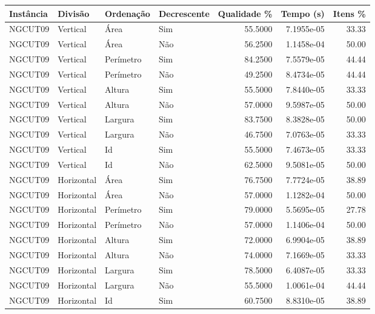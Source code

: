 \begin{tabular}{llllrrr}
\hline
Instância & Divisão     & Ordenação & Decrescente & Qualidade \% & Tempo (s)  & Itens \% \\
\hline
NGCUT09   & Vertical    & Área      & Sim         & 55.5000      & 7.1955e-05 & 33.33    \\
NGCUT09   & Vertical    & Área      & Não         & 56.2500      & 1.1458e-04 & 50.00    \\
NGCUT09   & Vertical    & Perímetro & Sim         & 84.2500      & 7.5579e-05 & 44.44    \\
NGCUT09   & Vertical    & Perímetro & Não         & 49.2500      & 8.4734e-05 & 44.44    \\
NGCUT09   & Vertical    & Altura    & Sim         & 55.5000      & 7.8440e-05 & 33.33    \\
NGCUT09   & Vertical    & Altura    & Não         & 57.0000      & 9.5987e-05 & 50.00    \\
NGCUT09   & Vertical    & Largura   & Sim         & 83.7500      & 8.3828e-05 & 50.00    \\
NGCUT09   & Vertical    & Largura   & Não         & 46.7500      & 7.0763e-05 & 33.33    \\
NGCUT09   & Vertical    & Id        & Sim         & 55.5000      & 7.4673e-05 & 33.33    \\
NGCUT09   & Vertical    & Id        & Não         & 62.5000      & 9.5081e-05 & 50.00    \\
NGCUT09   & Horizontal  & Área      & Sim         & 76.7500      & 7.7724e-05 & 38.89    \\
NGCUT09   & Horizontal  & Área      & Não         & 57.0000      & 1.1282e-04 & 50.00    \\
NGCUT09   & Horizontal  & Perímetro & Sim         & 79.0000      & 5.5695e-05 & 27.78    \\
NGCUT09   & Horizontal  & Perímetro & Não         & 57.0000      & 1.1406e-04 & 50.00    \\
NGCUT09   & Horizontal  & Altura    & Sim         & 72.0000      & 6.9904e-05 & 38.89    \\
NGCUT09   & Horizontal  & Altura    & Não         & 74.0000      & 7.1669e-05 & 33.33    \\
NGCUT09   & Horizontal  & Largura   & Sim         & 78.5000      & 6.4087e-05 & 33.33    \\
NGCUT09   & Horizontal  & Largura   & Não         & 55.5000      & 1.0061e-04 & 44.44    \\
NGCUT09   & Horizontal  & Id        & Sim         & 60.7500      & 8.8310e-05 & 38.89    \\

\end{tabular}
